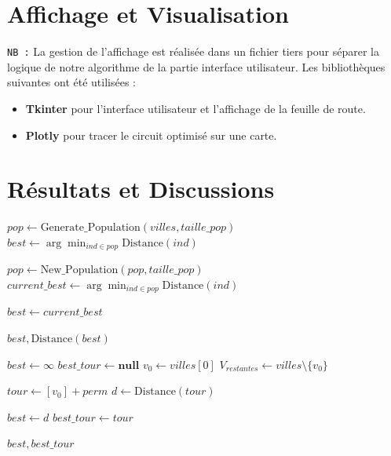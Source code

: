 \documentclass[a4paper,12pt]{article}
\begin{document}
\section{Affichage et Visualisation}
\texttt{NB :}  La gestion de l'affichage est réalisée dans un fichier tiers pour séparer la logique de notre algorithme de la partie interface utilisateur. Les bibliothèques suivantes ont été utilisées :
\begin{itemize}
    \item \textbf{Tkinter} pour l'interface utilisateur et l’affichage de la feuille de route.
    \item \textbf{Plotly} pour tracer le circuit optimisé sur une carte.
\end{itemize}

\section{Résultats et Discussions}
\begin{algorithm}
\caption{Algorithme Génétique pour le TSP}
\label{alg:tsp}
\begin{algorithmic}[1] %
    \State $pop \gets \text{Generate\_Population}(villes, taille\_pop)$
    \State $best \gets \arg\min_{ind \in pop} \text{Distance}(ind)$
    
        \State $pop \gets \text{New\_Population}(pop, taille\_pop)$
        \State $current\_best \gets \arg\min_{ind \in pop} \text{Distance}(ind)$
        
            \State $best \gets current\_best$
        \EndIf
    \EndFor
    
    \State \Return $best, \text{Distance}(best)$
\EndProcedure
\end{algorithmic}
\end{algorithm}

\begin{algorithm}
\caption{Bruteforce pour la résolution du TSP}
\label{alg:tsp_bruteforce}
\begin{algorithmic}[1]
    \State $best \gets \infty$
    \State $best\_tour \gets \textbf{null}$
    \State $v_0 \gets villes[0]$ 
    \State $V_{restantes} \gets villes \setminus \{v_0\}$
    
        \State $tour \gets [v_0] + perm$ 
        \State $d \gets \text{Distance}(tour)$
        
            \State $best \gets d$
            \State $best\_tour \gets tour$
        \EndIf
    \EndFor
    
    \State \Return $best, best\_tour$
\EndProcedure
\end{algorithmic}
\end{algorithm}
\end{document}
